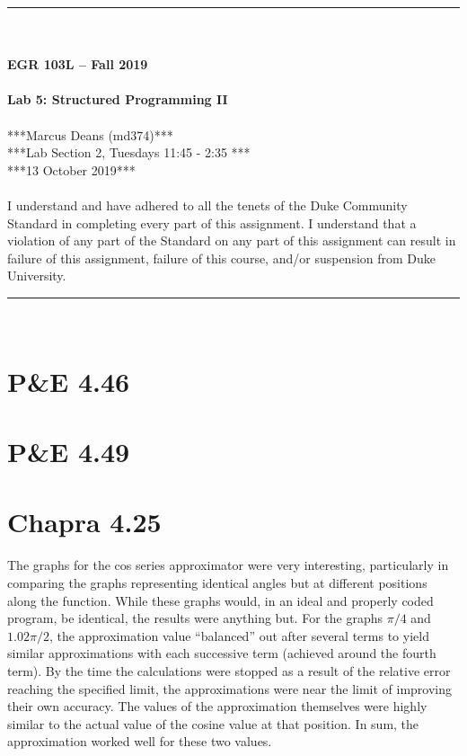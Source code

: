 \documentclass{article}
\begin{document}
\begin{center}
\rule{6.5in}{0.5mm}\\~\\
\textbf{\large EGR 103L -- Fall 2019}\\~\\
\textbf{\huge Lab 5: Structured Programming II}\\~\\
***Marcus Deans (md374)***\\
***Lab Section 2, Tuesdays 11:45 - 2:35 ***\\
***13 October 2019***\\~\\
{\small I understand and have adhered to all the tenets of the Duke
  Community Standard in completing every part of this assignment.  I
  understand that a violation of any part of the Standard on any part
  of this assignment can result in failure of this assignment, failure
  of this course, and/or suspension from Duke University.} 
\rule{6.5in}{0.5mm}\\
\end{center}
\tableofcontents
\listoffigures
\pagebreak

\section{P\&E 4.46}


\section{P\&E 4.49}


\section{Chapra 4.25}
The graphs for the cos series approximator were very interesting, particularly in comparing the graphs representing identical angles but at different positions along the
function. While these graphs would, in an ideal and properly coded program, be identical, the results were anything but. For the graphs $\pi/4$ and $1.02\pi/2$, the
approximation value ``balanced'' out after several terms to yield similar approximations with each successive term (achieved around the fourth term). By the time the
calculations were stopped as a result of the relative error reaching the specified limit, the approximations were near the limit of improving their own accuracy. The values
of the approximation themselves were highly similar to the actual value of the cosine value at that position. In sum, the approximation worked well for these two values.
\end{document}
